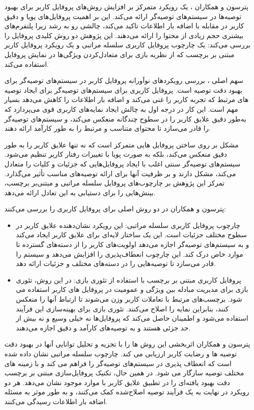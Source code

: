 پترسون و همکاران %
\cite{peterson2021user}،
 یک رویکرد متمرکز بر افزایش روش‌های پروفایل کاربر برای بهبود توصیه‌ها در سیستم‌های توصیه‌گر ارائه می‌کند. این بر اهمیت پروفایل‌های پویا و دقیق کاربر در مقابله با اضافه بار اطلاعات تاکید می‌کند، چالشی رو به رشد زیرا پلتفرم‌های بیشتری حجم زیادی از محتوا را ارائه می‌دهند. این پژوهش دو روش کلیدی پروفایل را بررسی می‌کند: یک چارچوب پروفایل کاربری سلسله مراتبی و یک رویکرد پروفایل کاربر مبتنی بر برچسب که از نظریه بازی برای متعادل‌کردن ویژگی‌ها در نمایش پروفایل استفاده می‌کند.

سهم اصلی \cite{peterson2021user}، بررسی رویکردهای نوآورانه پروفایل کاربر در سیستم‌های توصیه‌گر برای بهبود دقت توصیه است. پروفایل کاربری برای سیستم‌های توصیه‌گر برای ایجاد توصیه های مرتبط که تجربه کاربر را غنی می‌کند و اضافه بار اطلاعات را کاهش می‌دهد بسیار مهم است. این کار در درجه اول به چالش ایجاد نمایه‌های کاربری قوی می‌پردازد که به‌طور دقیق علایق کاربر را در سطوح چندگانه منعکس می‌کند، و سیستم‌های توصیه‌گر را قادر می‌سازد تا محتوای متناسب و مرتبط را به طور کارآمد ارائه دهند.

مشکل بر روی ساختن پروفایل هایی متمرکز است که نه تنها علایق کاربر را به طور دقیق منعکس می‌کند، بلکه به صورت پویا با تغییرات رفتار کاربر تنظیم می‌شود. سیستم‌های توصیه‌گر سنتی اغلب با ایجاد پروفایل‌هایی که جزئیات و کلیات را متعادل می‌کند، مشکل دارند و بر ظرفیت آنها برای ارائه توصیه‌های مناسب تأثیر می‌گذارد. تمرکز این پژوهش بر چارچوب‌های پروفایل سلسله مراتبی و مبتنی‌بر برچسب، بینش‌هایی را برای دستیابی به این تعادل ارائه می‌دهد.

پترسون و همکاران در 
\cite{peterson2021user}
دو روش اصلی برای پروفایل کاربری را بررسی می‌کنند:
\begin{itemize}
\item
چارچوب پروفایل کاربری سلسله مراتبی: این رویکرد نشان‌دهنده علایق کاربر در سطوح مختلف جزئیات است. این یک ساختار لایه‌ای برای علایق کاربر ایجاد می‌کند و به سیستم‌های توصیه‌گر اجازه می‌دهد اولویت‌های کاربر را از دسته‌های گسترده تا موارد خاص درک کند. این چارچوب انعطاف‌پذیری را افزایش می‌دهد و سیستم را قادر می‌سازد تا توصیه‌هایی را در دسته‌های مختلف و جزئیات ارائه دهد.
\item
پروفایل کاربری مبتنی بر برچسب با استفاده از تئوری بازی: در این روش، تئوری بازی برای مدیریت مبادله بین ویژگی و عمومیت در پروفایل های کاربر استفاده می شود. برچسب‌های مرتبط با تعاملات کاربر وزن می‌شوند تا ارتباط آنها را منعکس کنند، بنابراین نمایه را اصلاح می‌کنند. تئوری بازی برای بهینه‌سازی این فرآیند استفاده می‌شود و اطمینان حاصل می‌کند که پروفایل‌ها نه خیلی وسیع و نه بیش از حد جزئی هستند و به توصیه‌های کارآمد و دقیق اجازه می‌دهند.
\end{itemize}
پترسون و همکاران
\cite{peterson2021user}
اثربخشی این روش ها را با تجزیه و تحلیل توانایی آنها در بهبود دقت توصیه ها و رضایت کاربر ارزیابی می کند. چارچوب سلسله مراتبی نشان داده شده است که انعطاف پذیری در سیستم‌های توصیه‌گر را فراهم می کند و با زمینه های مختلف توصیه سازگار می شود. در همین حال، تکنیک پروفایل‌سازی مبتنی بر برچسب دقت بهبود یافته‌ای را در تطبیق علایق کاربر با موارد موجود نشان می‌دهد. هر دو رویکرد در نهایت به یک فرآیند توصیه اصلاح‌شده کمک می‌کنند، و به طور موثر به مسئله اضافه بار اطلاعات رسیدگی می‌کنند.


